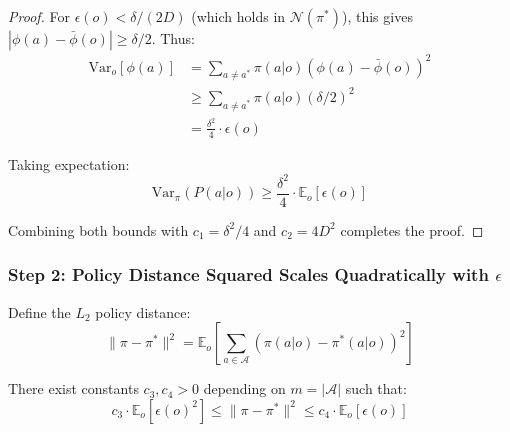 \begin{proof}
For $\epsilon(o) < \delta/(2D)$ (which holds in $\mathcal{N}(\pi^*)$), this gives $|\phi(a) - \bar{\phi}(o)| \ge \delta/2$. Thus:
\begin{align}
    \text{Var}_o[\phi(a)] &= \sum_{a \neq a^*} \pi(a|o) (\phi(a) - \bar{\phi}(o))^2 \\
    &\ge \sum_{a \neq a^*} \pi(a|o) (\delta/2)^2 \\
    &= \frac{\delta^2}{4} \cdot \epsilon(o)
\end{align}

Taking expectation:
\begin{equation}
    \text{Var}_{\pi}(P(a|o)) \ge \frac{\delta^2}{4} \cdot \mathbb{E}_o[\epsilon(o)]
\end{equation}

Combining both bounds with $c_1 = \delta^2/4$ and $c_2 = 4D^2$ completes the proof.
\end{proof}

\subsubsection{Step 2: Policy Distance Squared Scales Quadratically with $\epsilon$}

Define the $L_2$ policy distance:
\begin{equation}
    \|\pi - \pi^*\|^2 = \mathbb{E}_o\left[\sum_{a \in \mathcal{A}} (\pi(a|o) - \pi^*(a|o))^2\right]
\end{equation}

\begin{lemma}
\label{lem:dist_quadratic}
There exist constants $c_3, c_4 > 0$ depending on $m = |\mathcal{A}|$ such that:
\begin{equation}
    c_3 \cdot \mathbb{E}_o[\epsilon(o)^2] \le \|\pi - \pi^*\|^2 \le c_4 \cdot \mathbb{E}_o[\epsilon(o)]
    \label{eq:dist_quadratic_bound}
\end{equation}
\end{lemma}

